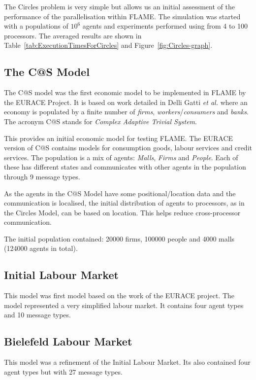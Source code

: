 The Circles problem is very simple but allows us an initial assessment of the performance of the parallelisation within FLAME. The simulation was started with a populations of $10^6$  agents and experiments performed using from 4 to 100 processors. The averaged results are shown in Table~\ref{tab:ExecutionTimesForCircles} and Figure~\ref{fig:Circles-graph}.
\subsection{The C@S Model}
The C@S model was the first economic model to be implemented in FLAME by the EURACE Project.  It is based on work detailed in Delli Gatti \textsl{et al.} \cite{Delli Gatti} where an economy is populated by a finite number of \textsl{firms}, \textsl{workers}/\textsl{consumers} and \textsl{banks}. The acronym C@S stands for \textsl{Complex Adaptive Trivial System}.

This provides an initial economic model for testing FLAME. The EURACE version of C@S contains models for consumption goods, labour services and credit services. The population is a mix of agents: \textsl{Malls}, \textsl{Firms} and \textsl{People}. Each of these has different states and communicates with other agents in the population through 9 message types.

As the agents in the C@S Model have some positional/location data and the communication is localised, the initial distribution of agents to processors, as in the Circles Model, can be based on location. This helps reduce cross-processor communication.

The initial population contained: 20000 firms, 100000 people and 4000 malls (124000 agents in total).
\subsection{Initial Labour Market}
This model was first model based on the work of the EURACE project. The model represented a very simplified labour market. It contains four agent types and 10 message types.
\subsection{Bielefeld Labour Market}
This model was a refinement of the Initial Labour Market. Its also contained four agent types but with 27 message types.

